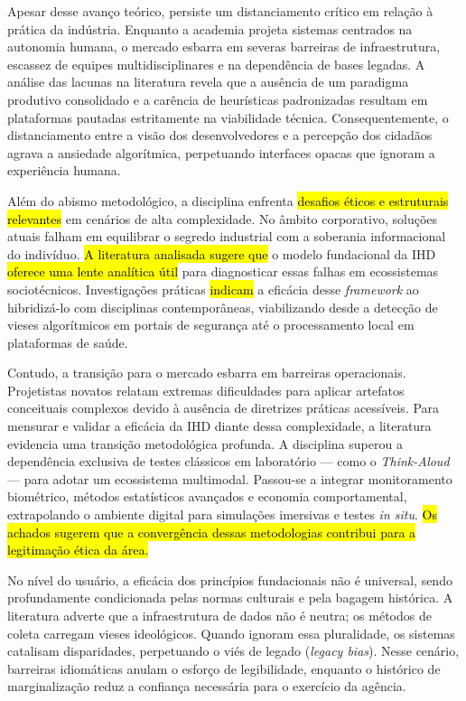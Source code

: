 \documentclass[
	12pt,				%
	oneside,			%
	a4paper,			%
	english,			%
	brazil				%
	]{abntex2ppgsi}
\begin{document}
    Apesar desse avanço teórico, persiste um distanciamento crítico em relação à prática da indústria. Enquanto a academia projeta sistemas centrados na autonomia humana, o mercado esbarra em severas barreiras de infraestrutura, escassez de equipes multidisciplinares e na dependência de bases legadas. A análise das lacunas na literatura revela que a ausência de um paradigma produtivo consolidado e a carência de heurísticas padronizadas resultam em plataformas pautadas estritamente na viabilidade técnica. Consequentemente, o distanciamento entre a visão dos desenvolvedores e a percepção dos cidadãos agrava a ansiedade algorítmica, perpetuando interfaces opacas que ignoram a experiência humana.

    Além do abismo metodológico, a disciplina enfrenta \hl{desafios éticos e estruturais relevantes} em cenários de alta complexidade. No âmbito corporativo, soluções atuais falham em equilibrar o segredo industrial com a soberania informacional do indivíduo. \hl{A literatura analisada sugere que} o modelo fundacional da IHD \hl{oferece uma lente analítica útil} para diagnosticar essas falhas em ecossistemas sociotécnicos. Investigações práticas \hl{indicam} a eficácia desse \textit{framework} ao hibridizá-lo com disciplinas contemporâneas, viabilizando desde a detecção de vieses algorítmicos em portais de segurança até o processamento local em plataformas de saúde.
    
    Contudo, a transição para o mercado esbarra em barreiras operacionais. Projetistas novatos relatam extremas dificuldades para aplicar artefatos conceituais complexos devido à ausência de diretrizes práticas acessíveis. Para mensurar e validar a eficácia da IHD diante dessa complexidade, a literatura evidencia uma transição metodológica profunda. A disciplina superou a dependência exclusiva de testes clássicos em laboratório — como o \textit{Think-Aloud} — para adotar um ecossistema multimodal. Passou-se a integrar monitoramento biométrico, métodos estatísticos avançados e economia comportamental, extrapolando o ambiente digital para simulações imersivas e testes \textit{in situ}. \hl{Os achados sugerem que a convergência dessas metodologias contribui para a legitimação ética da área.}

    No nível do usuário, a eficácia dos princípios fundacionais não é universal, sendo profundamente condicionada pelas normas culturais e pela bagagem histórica. A literatura adverte que a infraestrutura de dados não é neutra; os métodos de coleta carregam vieses ideológicos. Quando ignoram essa pluralidade, os sistemas catalisam disparidades, perpetuando o viés de legado (\textit{legacy bias}). Nesse cenário, barreiras idiomáticas anulam o esforço de legibilidade, enquanto o histórico de marginalização reduz a confiança necessária para o exercício da agência. 
    
\end{document}
